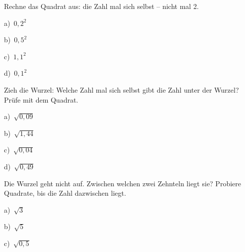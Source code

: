 \documentclass[11pt]{article}
\newcommand{\aufg}[3]{\par\noindent\makebox[0pt][r]{#3}\begin{minipage}[t]{\linewidth}#1\end{minipage}\par}
\newcommand{\nr}[1]{\makebox[7mm][l]{\textbf{#1}}}
\begin{document}
\aufg{\nr{D1}\begin{minipage}[t]{\dimexpr\linewidth-7mm\relax}Rechne das Quadrat aus: die Zahl mal sich selbst – nicht mal 2.\par\smallskip
\noindent\begin{minipage}[t]{0.48\linewidth}\raggedright
a)\ $0{,}2^2$
\end{minipage}\hfill
\begin{minipage}[t]{0.48\linewidth}\raggedright
b)\ $0{,}5^2$
\end{minipage}\par\smallskip
\noindent\begin{minipage}[t]{0.48\linewidth}\raggedright
c)\ $1{,}1^2$
\end{minipage}\hfill
\begin{minipage}[t]{0.48\linewidth}\raggedright
d)\ $0{,}1^2$
\end{minipage}\par\smallskip\end{minipage}}{}{}
\medskip
\aufg{\nr{D2}\begin{minipage}[t]{\dimexpr\linewidth-7mm\relax}Zieh die Wurzel: Welche Zahl mal sich selbst gibt die Zahl unter der Wurzel? Prüfe mit dem Quadrat.\par\smallskip
\noindent\begin{minipage}[t]{0.48\linewidth}\raggedright
a)\ $\sqrt{0{,}09}$
\end{minipage}\hfill
\begin{minipage}[t]{0.48\linewidth}\raggedright
b)\ $\sqrt{1{,}44}$
\end{minipage}\par\smallskip
\noindent\begin{minipage}[t]{0.48\linewidth}\raggedright
c)\ $\sqrt{0{,}04}$
\end{minipage}\hfill
\begin{minipage}[t]{0.48\linewidth}\raggedright
d)\ $\sqrt{0{,}49}$
\end{minipage}\par\smallskip\end{minipage}}{}{}
\medskip
\aufg{\nr{D3}\begin{minipage}[t]{\dimexpr\linewidth-7mm\relax}Die Wurzel geht nicht auf. Zwischen welchen zwei Zehnteln liegt sie? Probiere Quadrate, bis die Zahl dazwischen liegt.\par\smallskip
\noindent\begin{minipage}[t]{0.48\linewidth}\raggedright
a)\ $\sqrt{3}$
\end{minipage}\hfill
\begin{minipage}[t]{0.48\linewidth}\raggedright
b)\ $\sqrt{5}$
\end{minipage}\par\smallskip
\noindent\begin{minipage}[t]{0.48\linewidth}\raggedright
c)\ $\sqrt{0{,}5}$
\end{minipage}\par\smallskip\end{minipage}}{}{{\scriptsize\color{mbgrau}Ziel\hspace{2mm}}}
\end{document}
